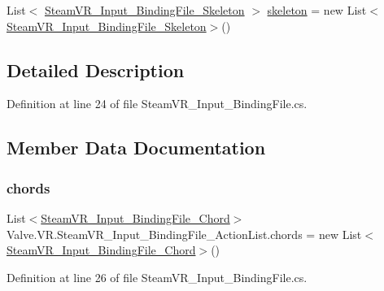 \begin{DoxyCompactItemize}
\item 
List$<$ \mbox{\hyperlink{class_valve_1_1_v_r_1_1_steam_v_r___input___binding_file___skeleton}{Steam\+V\+R\+\_\+\+Input\+\_\+\+Binding\+File\+\_\+\+Skeleton}} $>$ \mbox{\hyperlink{class_valve_1_1_v_r_1_1_steam_v_r___input___binding_file___action_list_ada6c5b07362e5fa549318e3e6814f446}{skeleton}} = new List$<$\mbox{\hyperlink{class_valve_1_1_v_r_1_1_steam_v_r___input___binding_file___skeleton}{Steam\+V\+R\+\_\+\+Input\+\_\+\+Binding\+File\+\_\+\+Skeleton}}$>$()
\end{DoxyCompactItemize}


\subsection{Detailed Description}


Definition at line 24 of file Steam\+V\+R\+\_\+\+Input\+\_\+\+Binding\+File.\+cs.



\subsection{Member Data Documentation}
\mbox{\label{class_valve_1_1_v_r_1_1_steam_v_r___input___binding_file___action_list_a99ae630664034bccb2ce8ede38f9b9db}} 
\subsubsection{\texorpdfstring{chords}{chords}}
{\footnotesize\ttfamily List$<$\mbox{\hyperlink{class_valve_1_1_v_r_1_1_steam_v_r___input___binding_file___chord}{Steam\+V\+R\+\_\+\+Input\+\_\+\+Binding\+File\+\_\+\+Chord}}$>$ Valve.\+V\+R.\+Steam\+V\+R\+\_\+\+Input\+\_\+\+Binding\+File\+\_\+\+Action\+List.\+chords = new List$<$\mbox{\hyperlink{class_valve_1_1_v_r_1_1_steam_v_r___input___binding_file___chord}{Steam\+V\+R\+\_\+\+Input\+\_\+\+Binding\+File\+\_\+\+Chord}}$>$()}



Definition at line 26 of file Steam\+V\+R\+\_\+\+Input\+\_\+\+Binding\+File.\+cs.

\mbox{\label{class_valve_1_1_v_r_1_1_steam_v_r___input___binding_file___action_list_a90284dfe5bd82029b9cc3dc827aaffdf}} 
